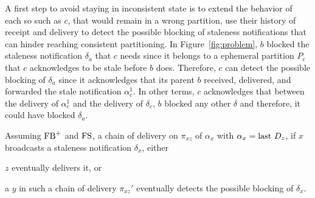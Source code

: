 A first step to avoid staying in inconsistent state is to extend the
behavior of each \process so \processes such as $c$, that would remain
in a wrong partition, use their history of receipt and delivery to
detect the possible blocking of staleness notifications that can
hinder reaching consistent partitioning.  In Figure~\ref{fig:problem},
$b$ blocked the staleness notification $\delta_a$ that $c$ needs since
it belongs to a ephemeral partition $P_c$ that $c$ acknowledges to be
stale before $b$ does. Therefore, $c$ can detect the possible blocking
of $\delta_a$ since it acknowledges that its parent $b$ received,
delivered, and forwarded the stale notification $\alpha_c^1$. In other
terms, $c$ acknowledges that between the delivery of $\alpha_c^1$ and
the delivery of $\delta_c$, $b$ blocked any other $\delta$ and
therefore, it could have blocked $\delta_a$.



\begin{lemma} Assuming
  $\textup{FB}^+$ and $\textup{FS}$, a chain of delivery on $\pi_{xz}$ of
  $\alpha_x$ with $\alpha_x = \textup{last}~ D_z$, if $x$ broadcasts a staleness
  notification $\delta_x$, either
  \begin{inparaenum}[(A)]
  \item\label{lem:detectorA}  $z$ eventually delivers it, or 
  \item\label{lem:detectorB} a \process $y$ in such a chain of
    delivery $\pi_{xz}'$ eventually detects the possible blocking of $\delta_x$.
  \end{inparaenum}
\end{lemma}


